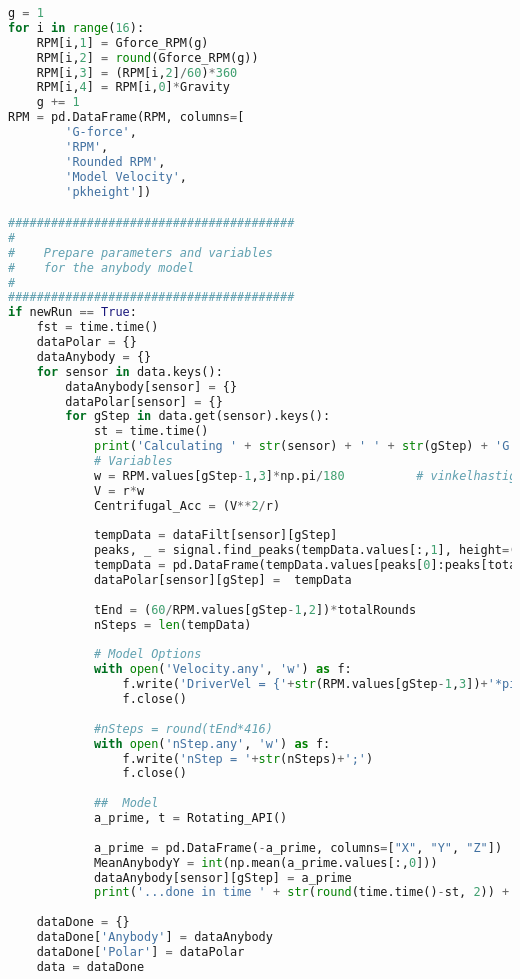 \begin{lstlisting}[language=Python]
g = 1
for i in range(16):
    RPM[i,1] = Gforce_RPM(g)
    RPM[i,2] = round(Gforce_RPM(g))
    RPM[i,3] = (RPM[i,2]/60)*360
    RPM[i,4] = RPM[i,0]*Gravity
    g += 1  
RPM = pd.DataFrame(RPM, columns=[
        'G-force',
        'RPM', 
        'Rounded RPM', 
        'Model Velocity', 
        'pkheight'])

########################################
#
#    Prepare parameters and variables 
#    for the anybody model
#
########################################
if newRun == True:
    fst = time.time()        
    dataPolar = {}
    dataAnybody = {}        
    for sensor in data.keys():
        dataAnybody[sensor] = {}
        dataPolar[sensor] = {}
        for gStep in data.get(sensor).keys():  
            st = time.time()
            print('Calculating ' + str(sensor) + ' ' + str(gStep) + 'G...', end =" ")
            # Variables               
            w = RPM.values[gStep-1,3]*np.pi/180          # vinkelhastighed (rad/s)
            V = r*w
            Centrifugal_Acc = (V**2/r)
            
            tempData = dataFilt[sensor][gStep]
            peaks, _ = signal.find_peaks(tempData.values[:,1], height=(RPM.values[gStep-1,4], None))
            tempData = pd.DataFrame(tempData.values[peaks[0]:peaks[totalRounds]])
            dataPolar[sensor][gStep] =  tempData
            
            tEnd = (60/RPM.values[gStep-1,2])*totalRounds
            nSteps = len(tempData) 
            
            # Model Options
            with open('Velocity.any', 'w') as f:
                f.write('DriverVel = {'+str(RPM.values[gStep-1,3])+'*pi/180};') # Set velocity in m/s 
                f.close()
            
            #nSteps = round(tEnd*416)  
            with open('nStep.any', 'w') as f:
                f.write('nStep = '+str(nSteps)+';') 
                f.close()
            
            ##  Model  
            a_prime, t = Rotating_API()
            
            a_prime = pd.DataFrame(-a_prime, columns=["X", "Y", "Z"])
            MeanAnybodyY = int(np.mean(a_prime.values[:,0]))
            dataAnybody[sensor][gStep] = a_prime
            print('...done in time ' + str(round(time.time()-st, 2)) + ' seconds.')
           
    dataDone = {}
    dataDone['Anybody'] = dataAnybody
    dataDone['Polar'] = dataPolar
    data = dataDone
    

\end{lstlisting}

